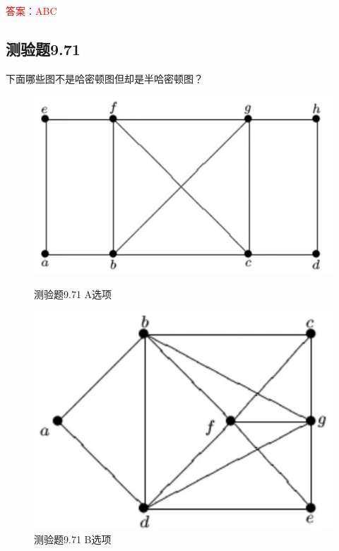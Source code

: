 \documentclass[UTF8, heading=true]{ctexart}
\begin{document}
\textcolor{red}{答案：ABC}

\subsection{测验题9.71}

下面哪些图不是哈密顿图但却是半哈密顿图？

\begin{figure}[H]
  \centering
  \begin{minipage}[t]{0.35\textwidth}
      \centering
      \includegraphics[width=1\textwidth]{9.67_1.jpg} %
      \vspace{-0.3cm}
      \caption{测验题9.71 A选项}
  \end{minipage}
  \hspace{0.1\textwidth} %
  \begin{minipage}[t]{0.35\textwidth}
      \centering
      \includegraphics[width=1\textwidth]{9.67_2.jpg} %
      \vspace{-0.3cm}
      \caption{测验题9.71 B选项}
\end{minipage}
\end{figure}
\end{document}
